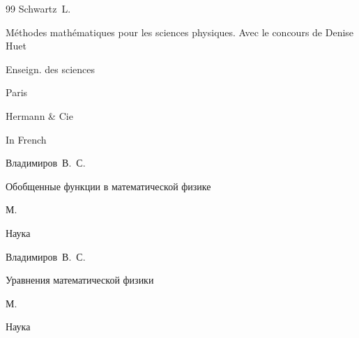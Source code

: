 \begin{thebibliography}{99}
\by Schwartz~L.

\book M\'ethodes math\'ematiques pour les sciences physiques. Avec le concours de Denise Huet

\serial Enseign. des sciences

\publaddr Paris

\publ Hermann \& Cie



\lang In French






\by Владимиров~В.~С.

\book Обобщенные функции в математической физике

\publaddr М.

\publ Наука















\by Владимиров~В.~С.

\book Уравнения математической физики

\publaddr М.

\publ Наука














\end{thebibliography}
